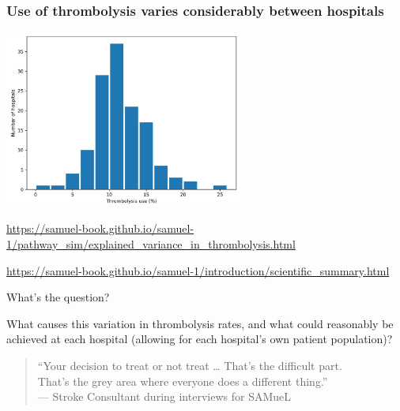 \documentclass[xcolor={usenames,dvipsnames}]{beamer}
\newcommand{\smallurl}[1]{\textcolor{blue}{\fontsize{4pt}{4.8pt}\selectfont \url{#1}}}
\begin{document}
\begin{frame}
\frametitle{Use of thrombolysis varies considerably between hospitals}
\begin{center}
\includegraphics[width=0.6\textwidth]{./images/thrombolysis_use_between_hospitals}
\end{center}


% 
\smallurl{https://samuel-book.github.io/samuel-1/pathway_sim/explained_variance_in_thrombolysis.html}

\smallurl{https://samuel-book.github.io/samuel-1/introduction/scientific_summary.html}


\end{frame}



\begin{frame}{What's the question?}

What causes this variation in thrombolysis rates, and what could reasonably be achieved at each hospital (allowing for each hospital's own patient population)?


\vspace{10mm}
\begin{quote}
  ``Your decision to treat or not treat … That’s the difficult part.\\
  That’s the grey area where everyone does a different thing.''\\
  \hfill\footnotesize\textnormal{— Stroke Consultant during interviews for SAMueL}
\end{quote}


\end{frame}
\end{document}
